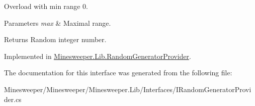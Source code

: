 Overload with min range 0. 


\begin{DoxyParams}{Parameters}
{\em max} & Maximal range.\\
\hline
\end{DoxyParams}
\begin{DoxyReturn}{Returns}
Random integer number.
\end{DoxyReturn}


Implemented in \hyperlink{class_minesweeper_1_1_lib_1_1_random_generator_provider_afabb9a038955a531abcb19cb0c6b77a3}{Minesweeper.\+Lib.\+Random\+Generator\+Provider}.



The documentation for this interface was generated from the following file\+:\begin{DoxyCompactItemize}
\item 
Minesweeper/\+Minesweeper/\+Minesweeper.\+Lib/\+Interfaces/I\+Random\+Generator\+Provider.\+cs\end{DoxyCompactItemize}
